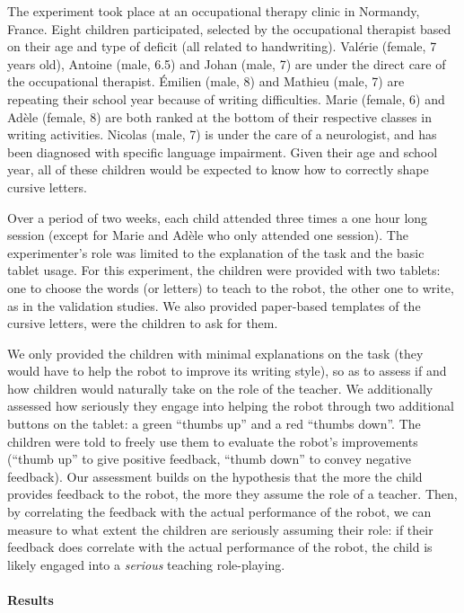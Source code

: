 \documentclass{article}
\begin{document}
The experiment took place at an occupational therapy clinic in
Normandy, France. Eight children participated, selected by the occupational
therapist based on their age and type of deficit (all related to handwriting).
Valérie (female, 7 years old), Antoine (male, 6.5) and Johan (male, 7) are under
the direct care of the occupational therapist. Émilien (male, 8) and Mathieu
(male, 7) are repeating their school year because of writing difficulties. Marie
(female, 6) and Adèle (female, 8) are both ranked at the bottom of their
respective classes in writing activities. Nicolas (male, 7) is under the care of
a neurologist, and has been diagnosed with specific language impairment. Given
their age and school year, all of these children would be expected to know how to
correctly shape cursive letters. 

Over a period of two weeks, each child attended three times a one hour long
session (except for Marie and Adèle who only attended one session). The
experimenter's role was limited to the explanation of the task and the basic
tablet usage. For this experiment, the children were provided with two tablets:
one to choose the words (or letters) to teach to the robot, the other one to
write, as in the validation studies. We also provided paper-based templates of
the cursive letters, were the children to ask for them.

We only provided the children with minimal explanations on the task (they would
have to help the robot to improve its writing style), so as to assess if and how
children would naturally take on the role of the teacher. We additionally assessed
how seriously they engage into helping the robot through two additional buttons
on the tablet: a green ``thumbs up'' and a red ``thumbs down''. The children
were told to freely use them to evaluate the robot's improvements (``thumb up''
to give positive feedback, ``thumb down'' to convey negative feedback). Our
assessment builds on the hypothesis that the more the child provides feedback to
the robot, the more they assume the role of a teacher. Then, by correlating the
feedback with the actual performance of the robot, we can measure to what extent
the children are seriously assuming their role: if their feedback does correlate
with the actual performance of the robot, the child is likely engaged into a
\emph{serious} teaching role-playing.


\paragraph{Results}
\end{document}
